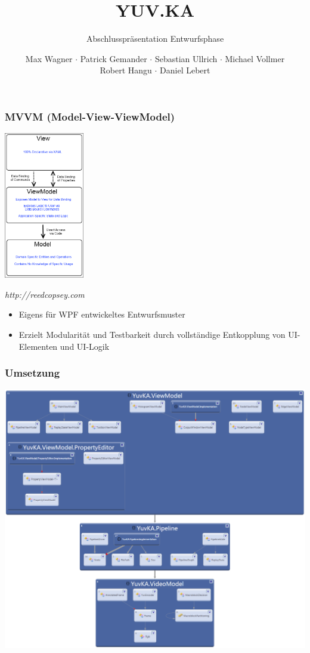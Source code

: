 \documentclass[t]{beamer}
\title{YUV.KA}
\subtitle{Abschlusspräsentation Entwurfsphase}
\author{Max Wagner $\cdot$ Patrick Gemander $\cdot$ Sebastian Ullrich $\cdot$ Michael Vollmer \\ Robert Hangu $\cdot$ Daniel Lebert}
\institute[ITEC]{Institut für Technische Informatik}
\begin{document}
\begin{frame}
\maketitle
\end{frame}
 
\begin{frame}
\frametitle{MVVM (Model-View-ViewModel)}
\noindent
\begin{minipage}{3.5cm}
\includegraphics[width=3.5cm]{MVVM_thumb.png}

\textit{http://reedcopsey.com}
\end{minipage}
\hfill
\begin{minipage}{8cm}
\begin{itemize}
    \item Eigens für WPF entwickeltes Entwurfsmuster
    \item Erzielt Modularität und Testbarkeit durch vollständige Entkopplung von UI-Elementen und UI-Logik
\end{itemize}
\end{minipage}
\end{frame}

\begin{frame}
\frametitle{Umsetzung}
\begin{center}
\includegraphics[height=0.9\textheight]{../Diagrams/namespacedependencies.png}
\end{center}
\end{frame}
\end{document}
